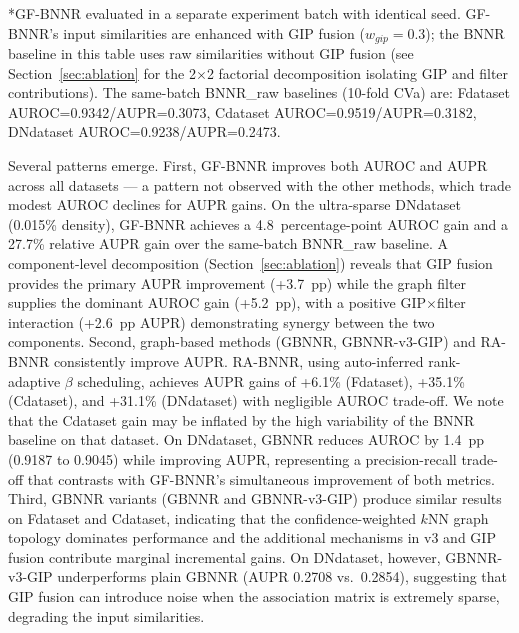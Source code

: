 \documentclass[unnumsec,webpdf,contemporary,large]{oup-authoring-template}
\begin{document}
\begin{table}[t]
\medskip
\footnotesize
*GF-BNNR evaluated in a separate experiment batch with identical seed.
GF-BNNR's input similarities are enhanced with GIP fusion ($w_{gip}=0.3$); the BNNR baseline in this table uses raw similarities without GIP fusion (see Section~\ref{sec:ablation} for the 2$\times$2 factorial decomposition isolating GIP and filter contributions). The same-batch BNNR\_raw baselines (10-fold CVa) are: Fdataset AUROC=0.9342/AUPR=0.3073, Cdataset AUROC=0.9519/AUPR=0.3182, DNdataset AUROC=0.9238/AUPR=0.2473.
\end{table}

Several patterns emerge. First, GF-BNNR improves both AUROC and AUPR across all datasets --- a pattern not observed with the other methods, which trade modest AUROC declines for AUPR gains. On the ultra-sparse DNdataset (0.015\% density), GF-BNNR achieves a 4.8~percentage-point AUROC gain and a 27.7\% relative AUPR gain over the same-batch BNNR\_raw baseline. A component-level decomposition (Section~\ref{sec:ablation}) reveals that GIP fusion provides the primary AUPR improvement (+3.7~pp) while the graph filter supplies the dominant AUROC gain (+5.2~pp), with a positive GIP$\times$filter interaction (+2.6~pp AUPR) demonstrating synergy between the two components. Second, graph-based methods (GBNNR, GBNNR-v3-GIP) and RA-BNNR consistently improve AUPR. RA-BNNR, using auto-inferred rank-adaptive $\beta$ scheduling, achieves AUPR gains of +6.1\% (Fdataset), +35.1\% (Cdataset), and +31.1\% (DNdataset) with negligible AUROC trade-off. We note that the Cdataset gain may be inflated by the high variability of the BNNR baseline on that dataset. On DNdataset, GBNNR reduces AUROC by 1.4~pp (0.9187 to 0.9045) while improving AUPR, representing a precision-recall trade-off that contrasts with GF-BNNR's simultaneous improvement of both metrics. Third, GBNNR variants (GBNNR and GBNNR-v3-GIP) produce similar results on Fdataset and Cdataset, indicating that the confidence-weighted $k$NN graph topology dominates performance and the additional mechanisms in v3 and GIP fusion contribute marginal incremental gains. On DNdataset, however, GBNNR-v3-GIP underperforms plain GBNNR (AUPR 0.2708 vs.\ 0.2854), suggesting that GIP fusion can introduce noise when the association matrix is extremely sparse, degrading the input similarities.
\end{document}
